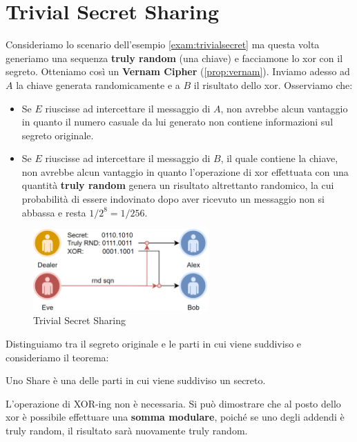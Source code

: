 \section{Trivial Secret Sharing}
\begin{example}
Consideriamo lo scenario dell'esempio \ref{exam:trivialsecret} ma questa volta generiamo una sequenza \textbf{truly random} (una chiave) e facciamone lo xor con il segreto. Otteniamo così un \textbf{Vernam Cipher} (\cref{prop:vernam}). Inviamo adesso ad $A$ la chiave generata randomicamente e a $B$ il risultato dello xor. Osserviamo che:\\
\begin{itemize}
    \item Se $E$ riuscisse ad intercettare il messaggio di $A$, non avrebbe alcun vantaggio in quanto il numero casuale da lui generato non contiene informazioni sul segreto originale.
    \item Se $E$ riuscisse ad intercettare il messaggio di $B$, il quale contiene la chiave, non avrebbe alcun vantaggio in quanto l'operazione di xor effettuata con una quantità \textbf{truly random} genera un risultato altrettanto randomico, la cui probabilità di essere indovinato dopo aver ricevuto un messaggio non si abbassa e resta $1/2^8=1/256$.
\end{itemize}
\end{example}
\begin{figure}[ht]
    \centering
    \includegraphics[width=0.6\textwidth]{image/secret_sharing/trivialsecret.png}
    \caption{Trivial Secret Sharing}
    \label{fig:trivialsecret}
\end{figure}
Distinguiamo tra il segreto originale e le parti in cui viene suddiviso e consideriamo il teorema:
\begin{definition}[Shares]\label{def:shares}
Uno Share è una delle parti in cui viene suddiviso un secreto.
\end{definition}
\begin{theorem}
L'operazione di XOR-ing non è necessaria. Si può dimostrare che al posto dello xor è possibile effettuare una \textbf{somma modulare}, poiché se uno degli addendi è truly random, il risultato sarà nuovamente truly random.
\end{theorem}
